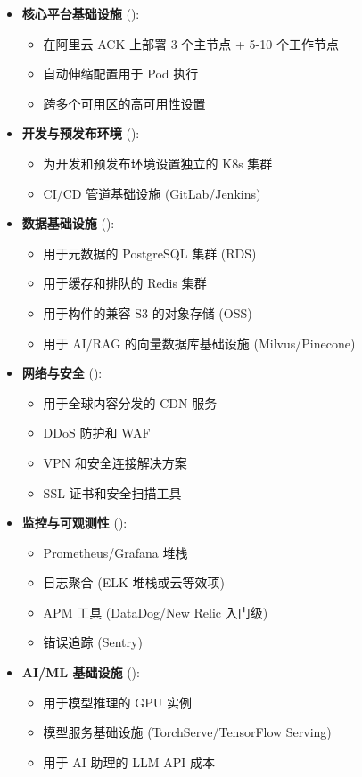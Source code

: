 \documentclass[11pt, a4paper, oneside]{article}
\begin{document}
\begin{itemize}
    \item \textbf{核心平台基础设施} ():
    \begin{itemize}
        \item 在阿里云 ACK 上部署 3 个主节点 + 5-10 个工作节点
        \item 自动伸缩配置用于 Pod 执行
        \item 跨多个可用区的高可用性设置
    \end{itemize}
    
    \item \textbf{开发与预发布环境} ():
    \begin{itemize}
        \item 为开发和预发布环境设置独立的 K8s 集群
        \item CI/CD 管道基础设施 (GitLab/Jenkins)
    \end{itemize}
    
    \item \textbf{数据基础设施} ():
    \begin{itemize}
        \item 用于元数据的 PostgreSQL 集群 (RDS)
        \item 用于缓存和排队的 Redis 集群
        \item 用于构件的兼容 S3 的对象存储 (OSS)
        \item 用于 AI/RAG 的向量数据库基础设施 (Milvus/Pinecone)
    \end{itemize}
    
    \item \textbf{网络与安全} ():
    \begin{itemize}
        \item 用于全球内容分发的 CDN 服务
        \item DDoS 防护和 WAF
        \item VPN 和安全连接解决方案
        \item SSL 证书和安全扫描工具
    \end{itemize}
    
    \item \textbf{监控与可观测性} ():
    \begin{itemize}
        \item Prometheus/Grafana 堆栈
        \item 日志聚合 (ELK 堆栈或云等效项)
        \item APM 工具 (DataDog/New Relic 入门级)
        \item 错误追踪 (Sentry)
    \end{itemize}
    
    \item \textbf{AI/ML 基础设施} ():
    \begin{itemize}
        \item 用于模型推理的 GPU 实例
        \item 模型服务基础设施 (TorchServe/TensorFlow Serving)
        \item 用于 AI 助理的 LLM API 成本
    \end{itemize}
\end{itemize}
\end{document}
